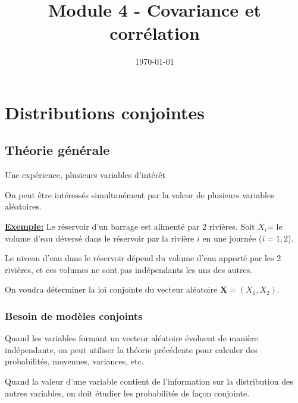 \documentclass{BeamerTemplate}
\title{Module 4 - Covariance et corrélation}
\date{\today}
\begin{document}
\begin{frame}[t]
  \titlepage
\end{frame}









\section{Distributions conjointes}

\subsection{Théorie générale}

\begin{frame}[t]{Une expérience, plusieurs variables d'intérêt}

{\small
On peut être intéressés \alert{simultanément} par la valeur de plusieurs variables aléatoires.

\medskip
\underline{\bf Exemple:} Le réservoir d'un barrage est alimenté par 2 rivières. Soit
$X_i$= le volume d'eau déversé dans le réservoir par la rivière $i$ en une journée
($i=1,2$).
\medskip

Le niveau d'eau dans le réservoir dépend du volume d'eau apporté par les 2 rivières, et ces volumes ne sont \alert{pas indépendants} les uns des autres.
\medskip

On voudra déterminer la \alert{loi conjointe du vecteur aléatoire ${\boldsymbol{X}}=(X_1, X_2)$}.
}



\end{frame}

\begin{frame}[t]
 \frametitle{Besoin de modèles conjoints}
 Quand les variables formant un vecteur aléatoire évoluent de manière indépendante, on peut utiliser la théorie précédente pour calculer des probabilités, moyennes, variances, etc.

 \bigskip
 Quand la valeur d'une variable contient de l'information sur la distribution des autres variables, on doit \alert{étudier les probabilités
 de façon conjointe}.

 \vspace{2cm}


\end{frame}
\end{document}
